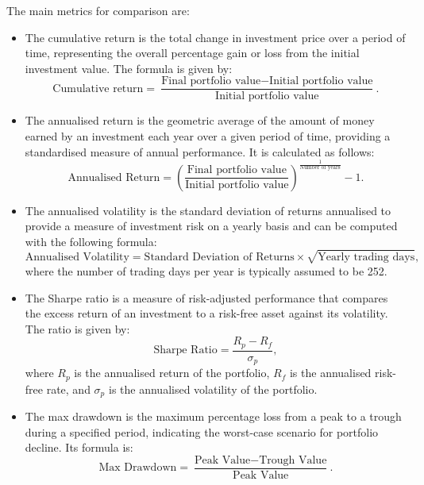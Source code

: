 The main metrics for comparison are:
\begin{itemize}
    \item The cumulative return is the total change in investment price over a period of time, representing the overall percentage gain or loss from the initial investment value. The formula is given by:
    \begin{equation}
        \text{Cumulative return} = \frac{\text{Final portfolio value} - \text{Initial portfolio value}}{\text{Initial portfolio value}}.
    \end{equation}
    \item The annualised return is the geometric average of the amount of money earned by an investment each year over a given period of time, providing a standardised measure of annual performance. It is calculated as follows:
    \begin{equation}
        \text{Annualised Return} = \left(\frac{\text{Final portfolio value}}{\text{Initial portfolio value}}\right)^{\frac{1}{\text{Number of years}}} - 1.
    \end{equation}
    \item The annualised volatility is the standard deviation of returns annualised to provide a measure of investment risk on a yearly basis and can be computed with the following formula:
    \begin{equation}
        \text{Annualised Volatility} = \text{Standard Deviation of Returns} \times \sqrt{\text{Yearly trading days}},
    \end{equation}
    where the number of trading days per year is typically assumed to be 252.
    \item The Sharpe ratio is a measure of risk-adjusted performance that compares the excess return of an investment to a risk-free asset against its volatility. The ratio is given by:
    \begin{equation}
        \text{Sharpe Ratio} = \frac{R_p - R_f}{\sigma_p},
    \end{equation}
    where $R_p$ is the annualised return of the portfolio, $R_f$ is the annualised risk-free rate, and $\sigma_p$ is the annualised volatility of the portfolio.
    \item The max drawdown is the maximum percentage loss from a peak to a trough during a specified period, indicating the worst-case scenario for portfolio decline. Its formula is:
    \begin{equation}
        \text{Max Drawdown} = \frac{\text{Peak Value} - \text{Trough Value}}{\text{Peak Value}}.
    \end{equation}
\end{itemize}

